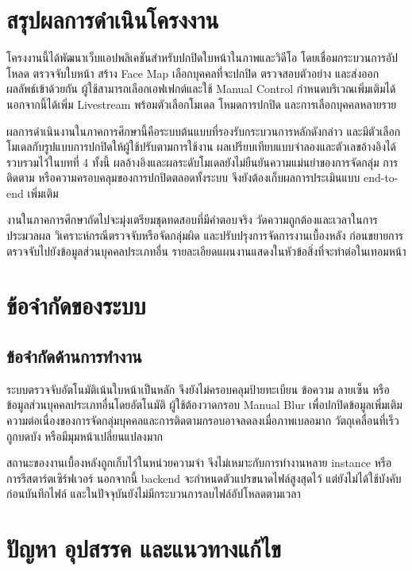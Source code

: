 \section{สรุปผลการดำเนินโครงงาน}

โครงงานนี้ได้พัฒนาเว็บแอปพลิเคชันสำหรับปกปิดใบหน้าในภาพและวิดีโอ โดยเชื่อมกระบวนการอัปโหลด ตรวจจับใบหน้า สร้าง Face Map เลือกบุคคลที่จะปกปิด ตรวจสอบตัวอย่าง และส่งออกผลลัพธ์เข้าด้วยกัน ผู้ใช้สามารถเลือกเอฟเฟกต์และใช้ Manual Control กำหนดบริเวณเพิ่มเติมได้ นอกจากนี้ได้เพิ่ม Livestream พร้อมตัวเลือกโมเดล โหมดการปกปิด และการเลือกบุคคลหลายราย

ผลการดำเนินงานในภาคการศึกษานี้คือระบบต้นแบบที่รองรับกระบวนการหลักดังกล่าว และมีตัวเลือกโมเดลกับรูปแบบการปกปิดให้ผู้ใช้ปรับตามการใช้งาน ผลเปรียบเทียบแบบจำลองและตัวเลขอ้างอิงได้รวบรวมไว้ในบทที่ 4 ทั้งนี้ ผลอ้างอิงและผลระดับโมเดลยังไม่ยืนยันความแม่นยำของการจัดกลุ่ม การติดตาม หรือความครอบคลุมของการปกปิดตลอดทั้งระบบ จึงยังต้องเก็บผลการประเมินแบบ end-to-end เพิ่มเติม

งานในภาคการศึกษาถัดไปจะมุ่งเตรียมชุดทดสอบที่มีคำตอบจริง วัดความถูกต้องและเวลาในการประมวลผล วิเคราะห์กรณีตรวจจับหรือจัดกลุ่มผิด และปรับปรุงการจัดการงานเบื้องหลัง ก่อนขยายการตรวจจับไปยังข้อมูลส่วนบุคคลประเภทอื่น รายละเอียดแผนงานแสดงในหัวข้อสิ่งที่จะทำต่อในเทอมหน้า

\section{ข้อจำกัดของระบบ}

\subsection{ข้อจำกัดด้านการทำงาน}

ระบบตรวจจับอัตโนมัติเน้นใบหน้าเป็นหลัก จึงยังไม่ครอบคลุมป้ายทะเบียน ข้อความ ลายเซ็น หรือข้อมูลส่วนบุคคลประเภทอื่นโดยอัตโนมัติ ผู้ใช้ต้องวาดกรอบ Manual Blur เพื่อปกปิดข้อมูลเพิ่มเติม ความต่อเนื่องของการจัดกลุ่มบุคคลและการติดตามกรอบอาจลดลงเมื่อภาพเบลอมาก วัตถุเคลื่อนที่เร็ว ถูกบดบัง หรือมีมุมหน้าเปลี่ยนแปลงมาก

สถานะของงานเบื้องหลังถูกเก็บไว้ในหน่วยความจำ จึงไม่เหมาะกับการทำงานหลาย instance หรือการรีสตาร์ตเซิร์ฟเวอร์ นอกจากนี้ backend จะกำหนดตัวแปรขนาดไฟล์สูงสุดไว้ แต่ยังไม่ได้ใช้บังคับก่อนบันทึกไฟล์ และในปัจจุบันยังไม่มีกระบวนการลบไฟล์อัปโหลดตามเวลา

\section{ปัญหา อุปสรรค และแนวทางแก้ไข}

